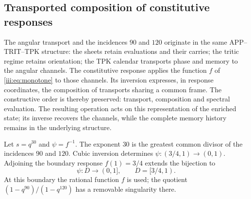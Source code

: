 \subsection{Transported composition of constitutive responses}
\label{amp-comp-sec}

The angular transport and the incidences $90$ and $120$ originate in the
same APP--TRIT--TPK structure: the sheets retain evaluations and their
carries; the tritic regime retains orientation; the TPK calendar transports
phase and memory to the angular channels. The constitutive response
applies the function $f$ of \eqref{iii:eq:monotone} to those channels.
Its inversion expresses, in response coordinates, the composition of
transports sharing a common frame. The constructive order is thereby
preserved: transport, composition and spectral evaluation. The resulting
operation acts on this representation of the enriched state; its inverse
recovers the channels, while the complete memory history remains in the
underlying structure.

Let $s=q^{30}$ and $\psi=f^{-1}$. The exponent $30$ is the greatest
common divisor of the incidences $90$ and $120$. Cubic inversion determines
$\psi:(3/4,1)\longrightarrow(0,1)$. Adjoining the boundary response
$f(1)=3/4$ extends the bijection to
\[
 \psi:D\longrightarrow(0,1],\qquad D=[3/4,1).
\]
At this boundary the rational function $f$ is used; the quotient
$(1-q^{90})/(1-q^{120})$ has a removable singularity there.

